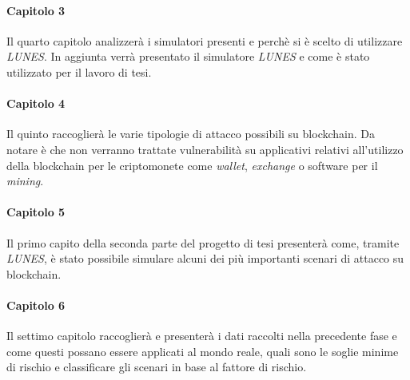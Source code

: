 \paragraph{Capitolo 3}
Il quarto capitolo analizzerà i simulatori presenti e perchè si è scelto di utilizzare \textit{LUNES}.
In aggiunta verrà presentato il simulatore \textit{LUNES} e come è stato utilizzato per il lavoro di tesi.

\paragraph{Capitolo 4}
Il quinto raccoglierà le varie tipologie di attacco possibili su blockchain. Da notare è che non verranno trattate vulnerabilità su applicativi relativi all'utilizzo della blockchain per le criptomonete come \textit{wallet}, \textit{exchange} o software per il \textit{mining}.

\paragraph{Capitolo 5}
Il primo capito della seconda parte del progetto di tesi presenterà come, tramite \textit{LUNES}, è stato possibile simulare alcuni dei più importanti scenari di attacco su blockchain.

\paragraph{Capitolo 6}
Il settimo capitolo raccoglierà e presenterà i dati raccolti nella precedente fase e come questi possano essere applicati al mondo reale, quali sono le soglie minime di rischio e classificare gli scenari in base al fattore di rischio.


